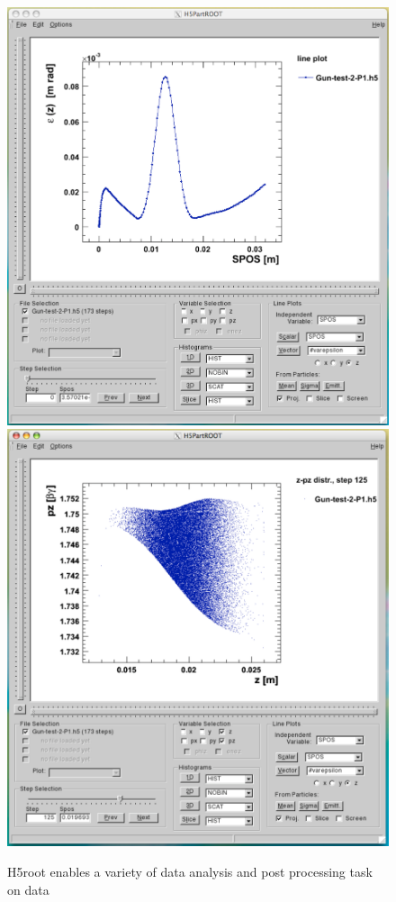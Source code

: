 \begin{figure}[ht]
 \begin{center}
 \includegraphics[width=0.45\linewidth,angle=0]{figures/H5rootPicture1}
  \includegraphics[width=0.45\linewidth,angle=0]{figures/H5rootPicture2}
  \caption{H5root enables a variety of data analysis and post processing task on \opal data}
  \label{fig:h5root1}
 \end{center}
\end{figure}



